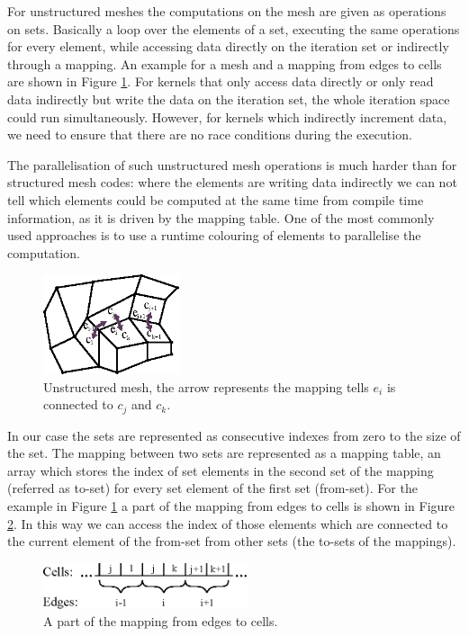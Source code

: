 For unstructured meshes the computations on the mesh are given as operations on
sets. Basically a loop over the elements of a set, executing the same
operations for every element, while accessing data directly on the iteration
set or indirectly through a mapping. An example for a mesh and a mapping from
edges to cells are shown in Figure \ref{fig:unstructured}. For kernels that
only access data directly or only read data indirectly but write the data on
the iteration set, the whole iteration space could run simultaneously. However,
for kernels which indirectly increment data, we need to ensure that there are
no race conditions during the execution.

The parallelisation of such unstructured mesh operations is much harder than
for structured mesh codes: where the elements are writing data indirectly we
can not tell which elements could be computed at the same time from compile
time information, as it is driven by the mapping table. One of the most
commonly used approaches is to use a runtime colouring of elements to
parallelise the computation.  

\begin{figure}
\centering
\includegraphics[width=4cm]{fig/svg/unstructured.eps}
\caption{Unstructured mesh, the arrow represents the mapping tells $e_i$ is
  connected to $c_j$ and $c_k$.}
\label{fig:unstructured}
\end{figure}

In our case the sets are represented as consecutive indexes from zero to the
size of the set. The mapping between two sets are represented as a mapping
table, an array which stores the index of set elements in the second set of the
mapping (referred as to-set) for every set element of the first set (from-set).
For the example in Figure \ref{fig:unstructured} a part of the mapping from
edges to cells is shown in Figure \ref{fig:mapping}. In this way we can access
the index of those elements which are connected to the current element of the
from-set from other sets (the to-sets of the mappings).

\begin{figure}
\centering
\includegraphics[width=6cm]{fig/svg/mapping.eps}
\caption{A part of the mapping from edges to cells.}
\label{fig:mapping}
\end{figure}

